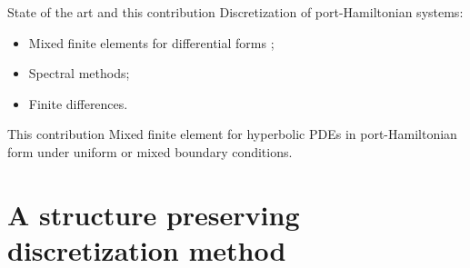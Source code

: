 \documentclass[aspectratio=169]{ISAE-Beamer}
\begin{document}
\begin{frame}{State of the art and this contribution}
Discretization of port-Hamiltonian systems:
\begin{itemize}
\item Mixed finite elements for differential forms ;
\item Spectral methods;
\item Finite differences.
\end{itemize}

\begin{exampleblock}{This contribution}
	Mixed finite element for hyperbolic PDEs in port-Hamiltonian form under uniform or mixed boundary conditions. 
\end{exampleblock}

\end{frame}


\section{A structure preserving discretization method}
\end{document}
